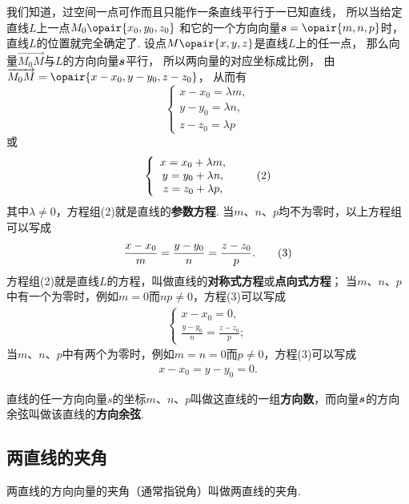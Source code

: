 我们知道，过空间一点可作而且只能作一条直线平行于一已知直线，%
所以当给定直线\(L\)上一点\(M_0\opair{x_0,y_0,z_0}\)%
和它的一个方向向量\(\mat{s}=\opair{m,n,p}\)时，%
直线\(L\)的位置就完全确定了.
设点\(M\opair{x,y,z}\)是直线\(L\)上的任一点，%
那么向量\(\vec{M_0M}\)与\(L\)的方向向量\(\boldsymbol{s}\)平行，%
所以两向量的对应坐标成比例，%
由\(\vec{M_0M}=\opair{x-x_0,y-y_0,z-z_0}\)，%
从而有\[
\left\{ \begin{array}{c}
x-x_0=\lambda m, \\
y-y_0=\lambda n, \\
z-z_0=\lambda p
\end{array} \right.
\]或\begin{gather}
\left\{ \begin{array}{c}
x=x_0+\lambda m, \\
y=y_0+\lambda n, \\
z=z_0+\lambda p,
\end{array} \right. \tag2
\end{gather}其中\(\lambda \neq 0\)，方程组(2)就是直线的\textbf{参数方程}.
当\(m\)、\(n\)、\(p\)均不为零时，以上方程组可以写成\begin{gather}
\frac{x-x_0}{m}=\frac{y-y_0}{n}=\frac{z-z_0}{p}. \tag3
\end{gather}
方程组(2)就是直线\(L\)的方程，叫做直线的\textbf{对称式方程}或\textbf{点向式方程}；
当\(m\)、\(n\)、\(p\)中有一个为零时，例如\(m=0\)而\(n p \neq 0\)，方程(3)可以写成\begin{gather}
\left\{ \begin{array}{l}
x-x_0=0, \\
\frac{y-y_0}{n}=\frac{z-z_0}{p};
\end{array} \right. \tag{3'}
\end{gather}
当\(m\)、\(n\)、\(p\)中有两个为零时，例如\(m=n=0\)而\(p \neq 0\)，方程(3)可以写成\begin{gather}
x-x_0=y-y_0=0. \tag{3''}
\end{gather}

\begin{definition}
直线的任一方向向量\(s\)的坐标\(m\)、\(n\)、\(p\)叫做这直线的一组\textbf{方向数}，而向量\(\boldsymbol{s}\)的方向余弦叫做该直线的\textbf{方向余弦}.
\end{definition}

\subsection{两直线的夹角}
\begin{definition}
两直线的方向向量的夹角（通常指锐角）叫做两直线的夹角.
\end{definition}

